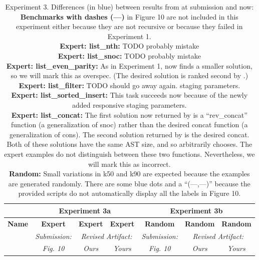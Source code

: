 \begin{table}

\experimentTableSize

\begin{tabular}{l|cccccc}
& \multicolumn{3}{c}{\textbf{Experiment 3a}}
& \multicolumn{3}{c}{\textbf{Experiment 3b}} \\\hline
\textbf{Name} &
\textbf{Expert} & \textbf{Expert} & \textbf{Expert} &
\textbf{Random} & \textbf{Random} & \textbf{Random} \\
&
\textit{Submission:} & \multicolumn{2}{c}{\textit{Revised Artifact:}} &
\textit{Submission:} & \multicolumn{2}{c}{\textit{Revised Artifact:}} \\
&
\textit{Fig. 10} & \textit{Ours} & \textit{Yours} &
\textit{Fig. 10} & \textit{Ours} & \textit{Yours} \\

\end{tabular}

\vspace{0.10in}

\caption{Experiment 3.
%
Differences (in blue) between results from \snsMyth{} at submission and
\snsMyth{} now:
%
\experimentCaptionSize
%
\\[3pt]
%
\textbf{Benchmarks with dashes ({---})} in Figure 10 are not included in this
experiment either because they are not recursive or because they failed in
Experiment 1.
%
\\[3pt]
%
\textbf{Expert: list\_nth:} TODO probably mistake
%
\\[3pt]
%
\textbf{Expert: list\_snoc:} TODO probably mistake
%
\\[3pt]
%
\textbf{Expert: list\_even\_parity:} As in Experiment 1, \snsMyth{} now finds a
smaller solution, so we will mark this as {\scriptsize{overspec}}. (The desired
solution is ranked second by \snsMyth{}.)
%
\\[3pt]
%
\textbf{Expert: list\_filter:} TODO should go away again. staging parameters.
%
\\[3pt]
%
\textbf{Expert: list\_sorted\_insert:} This task succeeds now because of the
newly added responsive staging parameters.
%
%
%
\\[3pt]
%
\textbf{Expert: list\_concat:} The first solution now returned by \snsMyth{} is
a ``rev\_concat'' function (a generalization of snoc) rather than the desired
concat function (a generalization of cons). The second solution returned by
\snsMyth{} is the desired concat. Both of these solutions have the same AST
size, and so \snsMyth{} arbitrarily chooses. The \myth{} expert examples do not
distinguish between these two functions. Nevertheless, we will mark this as
{\scriptsize{incorrect}}.
%
\\[3pt]
%
\textbf{Random:} Small variations in k50 and k90 are expected because the
examples are generated randomly. There are some blue dots and a ``(---,---)''
because the provided scripts do not automatically display all the labels in
Figure 10.
%
}

\end{table}
